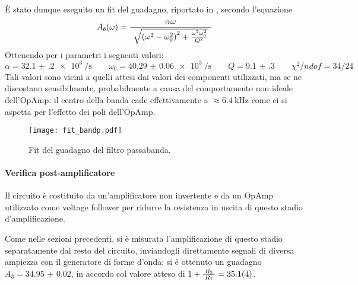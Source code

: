 	È stato dunque eseguito un fit del guadagno, riportato in , secondo l'equazione
	$$ A_b(\omega) = \longfrac{\alpha \omega}{\sqrt{\left(\omega^2 - \omega_0^2\right)^2 + \frac{\omega^2\omega_0^2}{Q^2}}} $$
	Ottenendo per i parametri i seguenti valori:
	$$ \alpha = \SI[per-mode=reciprocal]{32.1(2)e3}{\per\s} \qquad \omega_0 = \SI[per-mode=reciprocal]{40.29(6)e3}{\per\s} \qquad Q = \SI{9.1(3)}  \qquad \chi^2/ndof = 34/24$$
	Tali valori sono vicini a quelli attesi dai valori dei componenti utilizzati, ma se ne discostano sensibilmente, probabilmente a causa del comportamento non ideale dell'OpAmp: il centro della banda cade effettivamente a $\approx\SI{6.4}{\kHz}$ come ci si aspetta per l'effetto dei poli dell'OpAmp.

	\begin{figure}[h]
		\centering
		\texttt{[image: fit\_bandp.pdf]}
		\caption{Fit del guadagno del filtro passabanda.}
		\label{fig:bandfit}
	\end{figure}

	\paragraph{Verifica post-amplificatore}
	Il circuito è costituito da un'amplificatore non invertente e da un OpAmp utilizzato come voltage follower per ridurre la resistenza in uscita di questo stadio d'amplificazione.

	Come nelle sezioni precedenti, si è misurata l'amplificazione di questo stadio separatamente dal resto del circuito, inviandogli direttamente segnali di diversa ampiezza con il generatore di forme d'onda: si è ottenuto un guadagno $A_3 = \num{34.95(2)}$, in accordo col valore atteso di $1 + \longfrac[2pt]{R_2}{R_1} = \num{35.1(4)}$.

